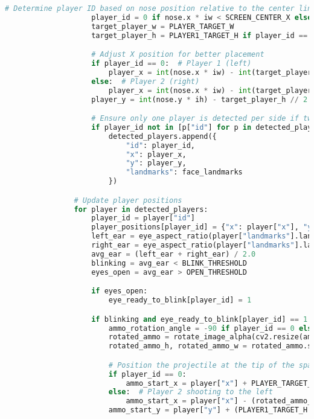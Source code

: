 \documentclass[11pt,a4paper]{article}
\begin{document}
\begin{lstlisting}[language=Python, caption=fungsi main]
                    # Determine player ID based on nose position relative to the center line
                    player_id = 0 if nose.x * iw < SCREEN_CENTER_X else 1
                    target_player_w = PLAYER_TARGET_W
                    target_player_h = PLAYER1_TARGET_H if player_id == 0 else PLAYER2_TARGET_H

                    # Adjust X position for better placement
                    if player_id == 0:  # Player 1 (left)
                        player_x = int(nose.x * iw) - int(target_player_w * 0.7)
                    else:  # Player 2 (right)
                        player_x = int(nose.x * iw) - int(target_player_w * 0.3)
                    player_y = int(nose.y * ih) - target_player_h // 2

                    # Ensure only one player is detected per side if two faces are detected
                    if player_id not in [p["id"] for p in detected_players]:
                        detected_players.append({
                            "id": player_id,
                            "x": player_x,
                            "y": player_y,
                            "landmarks": face_landmarks
                        })

                # Update player positions
                for player in detected_players:
                    player_id = player["id"]
                    player_positions[player_id] = {"x": player["x"], "y": player["y"]}
                    left_ear = eye_aspect_ratio(player["landmarks"].landmark, LEFT_EYE_IDX, iw, ih)
                    right_ear = eye_aspect_ratio(player["landmarks"].landmark, RIGHT_EYE_IDX, iw, ih)
                    avg_ear = (left_ear + right_ear) / 2.0
                    blinking = avg_ear < BLINK_THRESHOLD
                    eyes_open = avg_ear > OPEN_THRESHOLD

                    if eyes_open:
                        eye_ready_to_blink[player_id] = 1

                    if blinking and eye_ready_to_blink[player_id] == 1 and current_time - last_blink_time[player_id] >= BLINK_COOLDOWN:
                        ammo_rotation_angle = -90 if player_id == 0 else 90
                        rotated_ammo = rotate_image_alpha(cv2.resize(ammo_img_raw, (AMMO_W, AMMO_H), interpolation=cv2.INTER_AREA), ammo_rotation_angle)
                        rotated_ammo_h, rotated_ammo_w = rotated_ammo.shape[:2]

                        # Position the projectile at the tip of the spaceship
                        if player_id == 0:
                            ammo_start_x = player["x"] + PLAYER_TARGET_W - (rotated_ammo_w // 2)
                        else:  # Player 2 shooting to the left
                            ammo_start_x = player["x"] - (rotated_ammo_w // 2)
                        ammo_start_y = player["y"] + (PLAYER1_TARGET_H if player_id == 0 else PLAYER2_TARGET_H) // 2 - (rotated_ammo_h // 2)


\end{lstlisting}
\end{document}
